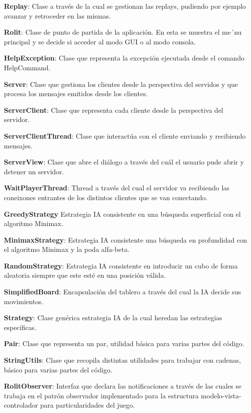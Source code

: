 \documentclass[../DocumentoOficial.tex]{subfiles}
\begin{document}
\textbf{Replay}: Clase a través de la cual se gestionan las replays, pudiendo por ejemplo avanzar y retroceder en las mismas.

\textbf{Rolit}: Clase de punto de partida de la aplicación. En esta se muestra el me´nu principal y se decide si acceder al modo GUI o al modo consola.

\textbf{HelpException}: Clase que representa la excepción ejecutada desde el comando HelpCommand.

\textbf{Server}: Clase que gestiona los clientes desde la perspectiva del servidos y que procesa los mensajes emitidos desde los clientes.

\textbf{ServerClient}: Clase que representa cada cliente desde la perspectiva del servidor.

\textbf{ServerClientThread}: Clase que interactúa con el cliente enviando y recibiendo mensajes.

\textbf{ServerView}: Clase que abre el diálogo a través del cuál el usuario pude abrir y detener un servidor.

\textbf{WaitPlayerThread}: Thread a través del cual el servidor va recibiendo las coneixones entrantes de los distintos clientes que se van conectando.

\textbf{GreedyStrategy} Estrategia IA consistente en una búsqueda superficial con el algoritmo Minimax.

\textbf{MinimaxStrategy}: Estrategia IA consistente una búsqueda en profundidad con el algoritmo Minimax y la poda alfa-beta.

\textbf{RandomStrategy}: Estrategia IA consistente en introducir un cubo de forma aleatoria siempre que este esté en una posición válida.


\textbf{SimplifiedBoard}: Encapsulación del tablero a través del cual la IA decide sus movimientos.

\textbf{Strategy}: Clase genérica estrategia IA de la cual heredan las estrategias específicas.

\textbf{Pair}: Clase que representa un par, utilidad básica para varias partes del código.

\textbf{StringUtils}: Clase que recopila distintas utilidades para trabajar con cadenas, básico para varias partes del código.

\textbf{RolitObserver}: Interfaz que declara las notificaciones a través de las cuales se trabaja en el patrón observador implementado para la estructura modelo-vista-controlador para particularidades del juego.
\end{document}
